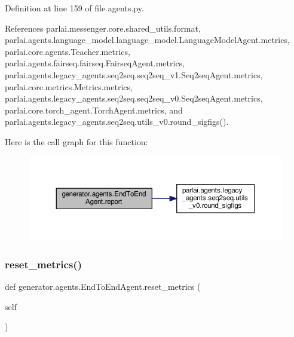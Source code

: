 Definition at line 159 of file agents.\+py.



References parlai.\+messenger.\+core.\+shared\+\_\+utils.\+format, parlai.\+agents.\+language\+\_\+model.\+language\+\_\+model.\+Language\+Model\+Agent.\+metrics, parlai.\+core.\+agents.\+Teacher.\+metrics, parlai.\+agents.\+fairseq.\+fairseq.\+Fairseq\+Agent.\+metrics, parlai.\+agents.\+legacy\+\_\+agents.\+seq2seq.\+seq2seq\+\_\+v1.\+Seq2seq\+Agent.\+metrics, parlai.\+core.\+metrics.\+Metrics.\+metrics, parlai.\+agents.\+legacy\+\_\+agents.\+seq2seq.\+seq2seq\+\_\+v0.\+Seq2seq\+Agent.\+metrics, parlai.\+core.\+torch\+\_\+agent.\+Torch\+Agent.\+metrics, and parlai.\+agents.\+legacy\+\_\+agents.\+seq2seq.\+utils\+\_\+v0.\+round\+\_\+sigfigs().

Here is the call graph for this function\+:
\nopagebreak
\begin{figure}[H]
\begin{center}
\leavevmode
\includegraphics[width=350pt]{classgenerator_1_1agents_1_1EndToEndAgent_a761044b6ad7410f5feb13e4231f60ce3_cgraph}
\end{center}
\end{figure}
\mbox{\label{classgenerator_1_1agents_1_1EndToEndAgent_ac63595362de55d7c700d1362af372cd3}} 
\subsubsection{\texorpdfstring{reset\+\_\+metrics()}{reset\_metrics()}}
{\footnotesize\ttfamily def generator.\+agents.\+End\+To\+End\+Agent.\+reset\+\_\+metrics (\begin{DoxyParamCaption}\item[{}]{self }\end{DoxyParamCaption})}




